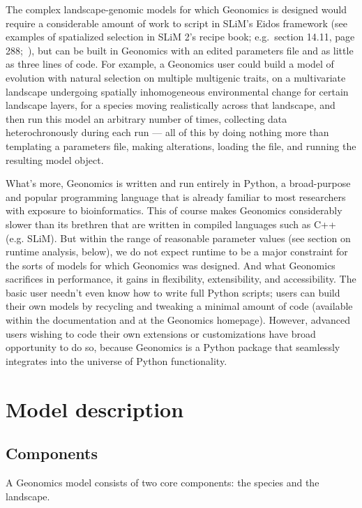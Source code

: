 ﻿\documentclass{article}
\begin{document}
The complex landscape-genomic models for which Geonomics is designed would require a considerable amount
of work to script in SLiM's Eidos framework (see examples of spatialized selection in SLiM 2's recipe book;
e.g.\ section 14.11, page 288;~\cite{slim_manual}), but can be built in Geonomics
with an edited parameters file and as little as three lines of code.
For example, a Geonomics user could build a model of evolution with natural selection
on multiple multigenic traits, on a multivariate landscape undergoing spatially inhomogeneous
environmental change for certain landscape layers, for a species moving realistically across that landscape,
and then run this model an arbitrary number of times, collecting data heterochronously during each
run --- all of this by doing nothing more than templating a parameters file, making alterations,
loading the file, and running the resulting model object.

What's more, Geonomics is written and run entirely in Python, a broad-purpose and popular
programming language that is already familiar to most researchers with exposure to bioinformatics.
This of course makes Geonomics considerably slower than its brethren that are
written in compiled languages such as C++ (e.g. SLiM). 
But within the range of reasonable parameter values (see section on runtime analysis, below), 
we do not expect runtime to be a major constraint for the sorts of models
for which Geonomics was designed.
And what Geonomics sacrifices in performance, it gains in flexibility, extensibility, and accessibility.
The basic user needn't even know how to write full Python scripts;
users can build their own models by recycling and tweaking
a minimal amount of code (available within the documentation and at the Geonomics homepage).
However, advanced users wishing to code their own extensions or customizations
have broad opportunity to do so,
because Geonomics is a Python package that seamlessly integrates into the universe of Python functionality.


\section{Model description}

\subsection{Components}
A Geonomics model consists of two core components: the species and the landscape.
\end{document}
